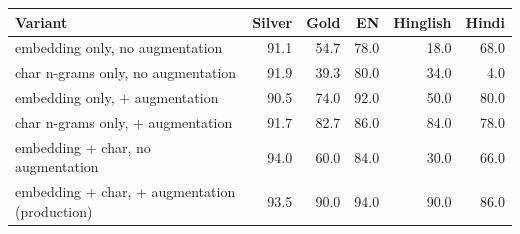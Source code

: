 \begin{tabular}{lrrrrr}
\toprule
Variant & Silver & Gold & EN & Hinglish & Hindi \\
\midrule
embedding only, no augmentation & 91.1 & 54.7 & 78.0 & 18.0 & 68.0 \\
char n-grams only, no augmentation & 91.9 & 39.3 & 80.0 & 34.0 & 4.0 \\
embedding only, + augmentation & 90.5 & 74.0 & 92.0 & 50.0 & 80.0 \\
char n-grams only, + augmentation & 91.7 & 82.7 & 86.0 & 84.0 & 78.0 \\
embedding + char, no augmentation & 94.0 & 60.0 & 84.0 & 30.0 & 66.0 \\
embedding + char, + augmentation (production) & 93.5 & 90.0 & 94.0 & 90.0 & 86.0 \\
\bottomrule
\end{tabular}